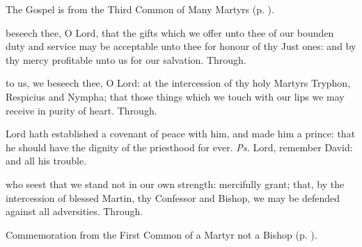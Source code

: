 \begin{rubric}
	The Gospel is from the Third Common of Many Martyrs (p. \pageref{CommonMartyrsIIIGospel}).
\end{rubric}


\secret
{} beseech thee, O Lord, that the gifts which we offer unto thee of our bounden duty and service may be acceptable unto thee for honour of thy Just ones: and by thy mercy profitable unto us for our salvation. Through.


\postcommunion
{} to us, we beseech thee, O Lord: at the intercession of thy holy Martyrs Tryphon, Respicius and Nympha; that those things which we touch with our lips we may receive in purity of heart. Through.


\clearpage
{}

\introit
{} Lord hath established a covenant of peace with him, and made him a prince: that he should have the dignity of the priesthood for ever. \textit{Ps.} Lord, remember David: and all his trouble.

\collect
{} who seest that we stand not in our own strength: mercifully grant; that, by the intercession of blessed Martin, thy Confessor and Bishop, we may be defended against all adversities. Through.

\begin{rubric}
    Commemoration  from the First Common of a Martyr not a Bishop (p. \pageref{CommonMartyrNotBishopI}).
\end{rubric}


